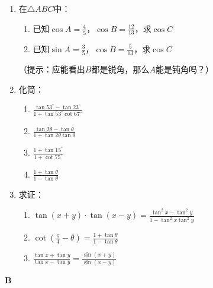 \begin{enumerate}
\item 在$\triangle ABC$中：
\begin{enumerate}[(1)]
    \item 已知$\cos A=\frac{4}{5}$，$\cos B=\frac{12}{13}$，求$\cos C$
    \item 已知$\sin A=\frac{3}{5}$，$\cos B=\frac{5}{13}$，求$\cos C$
\end{enumerate}
（提示：应能看出$B$都是锐角，那么$A$能是钝角吗？）

\item 化简：
\begin{multicols}{2}
\begin{enumerate}[(1)]
    \item $\frac{\tan53^{\circ}-\tan 23^{\circ}}{1+\tan53^{\circ}\cot67^{\circ}}$
    \item $\frac{\tan2\theta-\tan\theta}{1+\tan2\theta\tan\theta}$
    \item $\frac{1+\tan15^{\circ}}{1+\cot 75^{\circ}}$
    \item $\frac{1+\tan\theta}{1-\tan\theta}$
\end{enumerate}
\end{multicols}

\item 求证：
\begin{enumerate}[(1)]
    \item $\tan(x+y)\cdot \tan(x-y)=\frac{\tan^2 x-\tan^2 y}{1-\tan^2 x\tan^2 y}$
    \item $\cot\left(\frac{\pi}{4}-\theta\right)=\frac{1+\tan\theta}{1-\tan\theta}$
    \item $\frac{\tan x+\tan y}{\tan x-\tan y}=\frac{\sin(x+y)}{\sin(x-y)}$
\end{enumerate}
\end{enumerate}

\begin{center}
    \bfseries B
\end{center}

